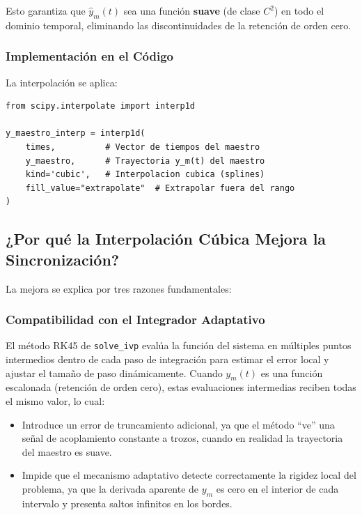 \documentclass[12pt,a4paper]{article}
\begin{document}
	Esto garantiza que $\hat{y}_m(t)$ sea una función \textbf{suave} (de clase $C^2$) en todo el dominio temporal, eliminando las discontinuidades de la retención de orden cero.
	
	\subsubsection{Implementación en el Código}
	
	La interpolación se aplica:
	
	\begin{lstlisting}
from scipy.interpolate import interp1d

y_maestro_interp = interp1d(
	times,          # Vector de tiempos del maestro
	y_maestro,      # Trayectoria y_m(t) del maestro
	kind='cubic',   # Interpolacion cubica (splines)
	fill_value="extrapolate"  # Extrapolar fuera del rango
)
	\end{lstlisting}

	\subsection{¿Por qué la Interpolación Cúbica Mejora la Sincronización?}
	
	La mejora se explica por tres razones fundamentales:
	
	\subsubsection{Compatibilidad con el Integrador Adaptativo}
	
	El método RK45 de \texttt{solve\_ivp} evalúa la función del sistema en múltiples puntos intermedios dentro de cada paso de integración para estimar el error local y ajustar el tamaño de paso dinámicamente. Cuando $y_m(t)$ es una función escalonada (retención de orden cero), estas evaluaciones intermedias reciben todas el mismo valor, lo cual:
	
	\begin{itemize}
		\item Introduce un error de truncamiento adicional, ya que el método ``ve'' una señal de acoplamiento constante a trozos, cuando en realidad la trayectoria del maestro es suave.
		\item Impide que el mecanismo adaptativo detecte correctamente la rigidez local del problema, ya que la derivada aparente de $y_m$ es cero en el interior de cada intervalo y presenta saltos infinitos en los bordes.
	\end{itemize}
	
\end{document}
